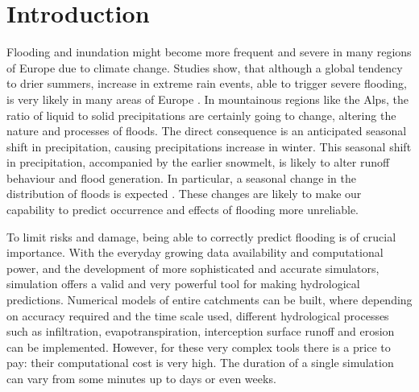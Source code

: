 \chapter{Introduction}
\label{chp:introduction}

\newcommand{\keyword}[1]{\textbf{#1}}
\newcommand{\tabhead}[1]{\textbf{#1}}
\newcommand{\code}[1]{\texttt{#1}}
\newcommand{\file}[1]{\texttt{\bfseries#1}}
\newcommand{\option}[1]{\texttt{\itshape#1}}

Flooding and inundation might become more frequent and severe in many regions of Europe due to climate change.
Studies show, that although a global tendency to drier summers, increase in extreme rain events, able to trigger severe flooding, is very likely in many areas of Europe \autocite{christensen_severe_2002}.
In mountainous regions like the Alps, the ratio of liquid to solid precipitations are certainly going to change, altering the nature and processes of floods.
The direct consequence is an anticipated seasonal shift in precipitation, causing precipitations increase in winter. 
This seasonal shift in precipitation, accompanied by the earlier snowmelt, is likely to alter runoff behaviour and flood generation.
In particular, a seasonal change in the distribution of floods is expected \autocite{koplin_seasonality_2014}.
These changes are likely to make our capability to predict occurrence and effects of flooding more unreliable.

To limit risks and damage, being able to correctly predict flooding is of crucial importance.
With the everyday growing data availability and computational power, and the development of more sophisticated and accurate simulators, simulation offers a valid and very powerful tool for making hydrological predictions.
Numerical models of entire catchments can be built, where depending on accuracy required and the time scale used, different hydrological processes such as infiltration, evapotranspiration, interception surface runoff and erosion can be implemented.
However, for these very complex tools there is a price to pay: their computational cost is very high.
The duration of a single simulation can vary from some minutes up to days or even weeks.

